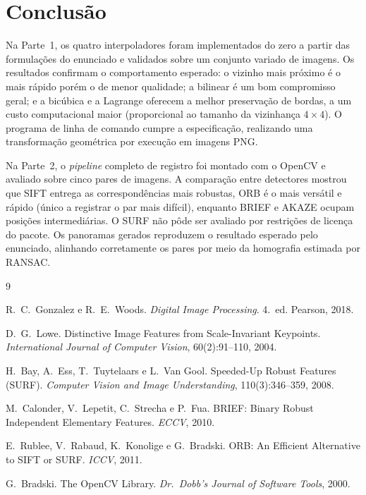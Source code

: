 \documentclass[12pt,a4paper]{article}
\begin{document}
\section{Conclusão}

Na Parte~1, os quatro interpoladores foram implementados do zero a partir das
formulações do enunciado e validados sobre um conjunto variado de imagens. Os
resultados confirmam o comportamento esperado: o vizinho mais próximo é o mais
rápido porém o de menor qualidade; a bilinear é um bom compromisso geral; e a
bicúbica e a Lagrange oferecem a melhor preservação de bordas, a um custo
computacional maior (proporcional ao tamanho da vizinhança $4\times4$). O
programa de linha de comando cumpre a especificação, realizando uma
transformação geométrica por execução em imagens PNG.

Na Parte~2, o \emph{pipeline} completo de registro foi montado com o OpenCV e
avaliado sobre cinco pares de imagens. A comparação entre detectores mostrou que
SIFT entrega as correspondências mais robustas, ORB é o mais versátil e rápido
(único a registrar o par mais difícil), enquanto BRIEF e AKAZE ocupam posições
intermediárias. O SURF não pôde ser avaliado por restrições de licença do
pacote. Os panoramas gerados reproduzem o resultado esperado pelo enunciado,
alinhando corretamente os pares por meio da homografia estimada por RANSAC.

\begin{thebibliography}{9}

  R.~C.~Gonzalez e R.~E.~Woods.
  \emph{Digital Image Processing}. 4.~ed. Pearson, 2018.

  D.~G.~Lowe.
  Distinctive Image Features from Scale-Invariant Keypoints.
  \emph{International Journal of Computer Vision}, 60(2):91--110, 2004.

  H.~Bay, A.~Ess, T.~Tuytelaars e L.~Van Gool.
  Speeded-Up Robust Features (SURF).
  \emph{Computer Vision and Image Understanding}, 110(3):346--359, 2008.

  M.~Calonder, V.~Lepetit, C.~Strecha e P.~Fua.
  BRIEF: Binary Robust Independent Elementary Features.
  \emph{ECCV}, 2010.

  E.~Rublee, V.~Rabaud, K.~Konolige e G.~Bradski.
  ORB: An Efficient Alternative to SIFT or SURF.
  \emph{ICCV}, 2011.

  G.~Bradski.
  The OpenCV Library.
  \emph{Dr.~Dobb's Journal of Software Tools}, 2000.

\end{thebibliography}
\end{document}
